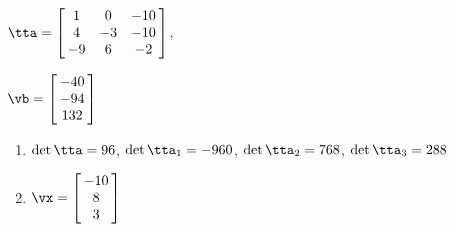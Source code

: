 {$\tta = \left[\hskip -3pt \begin{array}{ccc} 1&0&-10\\  4&-3&-10
\\  -9&6&-2\end{array}\hskip -3pt \right] $,

$\vb = \left[\hskip -3pt \begin{array}{c} -40\\  -94
\\  132\end{array}\hskip -3pt \right]$}
{\begin{enumerate}
\item	$\det{\tta} = 96$, $\det{\tta_1} = -960$, $\det{\tta_2} = 768$, $\det{\tta_3} = 288$
\item $\vx = \left[\hskip -3pt \begin{array}{c} -10\\  8\\  
3\end{array}\hskip -3pt \right]$
\end{enumerate}
}

 

 

